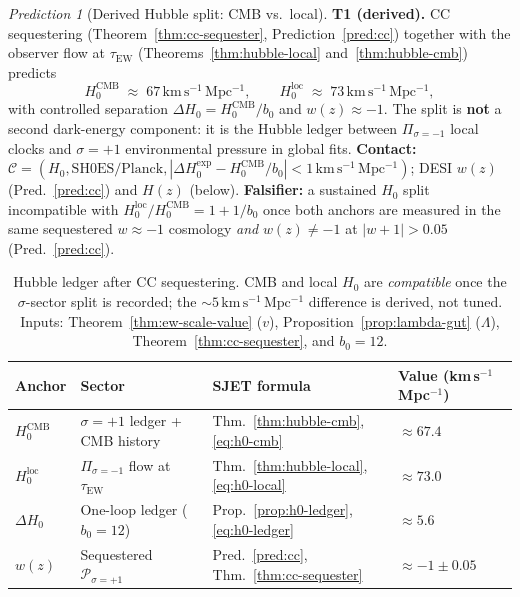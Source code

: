 \documentclass[11pt]{article}
\theoremstyle{plain}
\theoremstyle{definition}
\theoremstyle{remark}
\newtheorem{prediction}[theorem]{Prediction}
\numberwithin{equation}{section}
\begin{document}
\begin{prediction}[Derived Hubble split: CMB vs.\ local]\label{pred:h0}
\textbf{T1 (derived).} CC sequestering (Theorem~\ref{thm:cc-sequester},
Prediction~\ref{pred:cc}) together with the observer flow at
$\tau_{\mathrm{EW}}$ (Theorems~\ref{thm:hubble-local}
and~\ref{thm:hubble-cmb}) predicts
\begin{equation}\label{eq:pred-h0}
  H_0^{\mathrm{CMB}}
  \;\approx\;
  67\,\mathrm{km\,s^{-1}\,Mpc^{-1}},
  \qquad
  H_0^{\mathrm{loc}}
  \;\approx\;
  73\,\mathrm{km\,s^{-1}\,Mpc^{-1}},
\end{equation}
with controlled separation $\Delta H_0=H_0^{\mathrm{CMB}}/b_0$ and
$w(z)\approx -1$. The split is \textbf{not} a second dark-energy component:
it is the Hubble ledger between $\Pi_{\sigma=-1}$ local clocks and
$\sigma=+1$ environmental pressure in global fits.
\textbf{Contact:}
$\mathcal{C}=(H_0,\mathrm{SH0ES/Planck},|\Delta H_0^{\mathrm{exp}}-
H_0^{\mathrm{CMB}}/b_0|<1\,\mathrm{km\,s^{-1}\,Mpc^{-1}})$;
DESI $w(z)$ (Pred.~\ref{pred:cc}) and $H(z)$ (below).
\textbf{Falsifier:} a sustained $H_0$ split incompatible with
$H_0^{\mathrm{loc}}/H_0^{\mathrm{CMB}}=1+1/b_0$ once both anchors are
measured in the same sequestered $w\approx -1$ cosmology \emph{and}
$w(z)\neq -1$ at $|w+1|>0.05$ (Pred.~\ref{pred:cc}).
\end{prediction}

\begin{table}[ht]
\centering
\small
\renewcommand{\arraystretch}{1.14}
\begin{tabular}{@{}llll@{}}
\toprule
\textbf{Anchor} & \textbf{Sector} & \textbf{SJET formula} &
\textbf{Value (km\,s$^{-1}$\,Mpc$^{-1}$)} \\
\midrule
$H_0^{\mathrm{CMB}}$ &
  $\sigma=+1$ ledger + CMB history &
  Thm.~\ref{thm:hubble-cmb}, \eqref{eq:h0-cmb} &
  $\approx 67.4$ \\
$H_0^{\mathrm{loc}}$ &
  $\Pi_{\sigma=-1}$ flow at $\tau_{\mathrm{EW}}$ &
  Thm.~\ref{thm:hubble-local}, \eqref{eq:h0-local} &
  $\approx 73.0$ \\
$\Delta H_0$ &
  One-loop ledger ($b_0=12$) &
  Prop.~\ref{prop:h0-ledger}, \eqref{eq:h0-ledger} &
  $\approx 5.6$ \\
$w(z)$ &
  Sequestered $\mathcal{P}_{\sigma=+1}$ &
  Pred.~\ref{pred:cc}, Thm.~\ref{thm:cc-sequester} &
  $\approx -1\pm 0.05$ \\
\bottomrule
\end{tabular}
\caption{Hubble ledger after CC sequestering. CMB and local $H_0$ are
\emph{compatible} once the $\sigma$-sector split is recorded; the
$\sim 5\,\mathrm{km\,s^{-1}\,Mpc^{-1}}$ difference is derived, not tuned.
Inputs: Theorem~\ref{thm:ew-scale-value} ($v$), Proposition~\ref{prop:lambda-gut}
($\Lambda$), Theorem~\ref{thm:cc-sequester}, and $b_0=12$.}
\label{tab:hubble}
\end{table}
\end{document}
